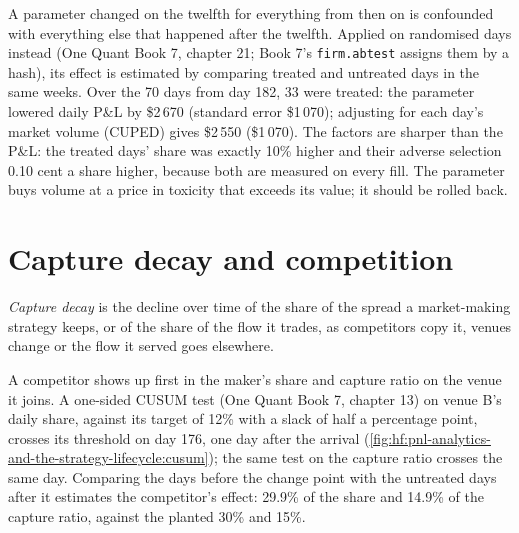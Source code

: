 A parameter changed on the twelfth for everything from then on is confounded with everything else that happened after the twelfth. Applied on
randomised days instead (One Quant Book 7, chapter 21; Book 7's \texttt{firm.abtest} assigns them by a hash), its effect is estimated by comparing
treated and untreated days in the same weeks. Over the 70 days from day 182, 33 were treated: the parameter lowered daily P\&L by \$2\,670 (standard
error \$1\,070); adjusting for each day's market volume (CUPED) gives \$2\,550 (\$1\,070). The factors are sharper than the P\&L: the treated days' share
was exactly 10\% higher and their adverse selection 0.10 cent a share higher, because both are measured on every fill. The parameter buys volume at a
price in toxicity that exceeds its value; it should be rolled back.

\section{Capture decay and competition}

\begin{definition}\label{def:hf:pnl-analytics-and-the-strategy-lifecycle:decay}
\emph{Capture decay} is the decline over time of the share of the spread a market-making strategy keeps, or of the share of the
flow it trades, as competitors copy it, venues change or the flow it served goes elsewhere.
\end{definition}

A competitor shows up first in the maker's share and capture ratio on the venue it joins. A one-sided CUSUM test (One Quant Book 7, chapter 13) on
venue B's daily share, against its target of 12\% with a slack of half a percentage point, crosses its threshold on day 176, one day after the arrival
(\cref{fig:hf:pnl-analytics-and-the-strategy-lifecycle:cusum}); the same test on the capture ratio crosses the same day. Comparing the days before
the change point with the untreated days after it estimates the competitor's effect: 29.9\% of the share and 14.9\% of the capture ratio, against the
planted 30\% and 15\%.


